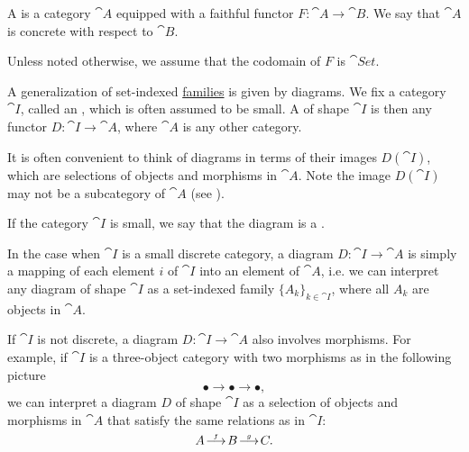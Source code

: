 \begin{definition}\label{def:concrete_category}
  A  is a category \( \cat{A} \) equipped with a faithful functor \( F: \cat{A} \to \cat{B} \). We say that \( \cat{A} \) is concrete with respect to \( \cat{B} \).

  Unless noted otherwise, we assume that the codomain of \( F \) is \( \cat{Set} \).
\end{definition}

\begin{definition}\label{def:categorical_diagram}
  A generalization of set-indexed \hyperref[def:indexed_family]{families} is given by diagrams. We fix a category \( \cat{I} \), called an , which is often assumed to be small. A  of shape \( \cat{I} \) is then any functor \( D: \cat{I} \to \cat{A} \), where \( \cat{A} \) is any other category.

  It is often convenient to think of diagrams in terms of their images \( D(\cat{I}) \), which are selections of objects and morphisms in \( \cat{A} \). Note the image \( D(\cat{I}) \) may not be a subcategory of \( \cat{A} \) (see ).

  If the category \( \cat{I} \) is small, we say that the diagram is a .
\end{definition}

\begin{example}\label{ex:categorical_diagrams}
  \hfill
  \begin{thmenum}
    \item In the case when \( \cat{I} \) is a small discrete category, a diagram \( D: \cat{I} \to \cat{A} \) is simply a mapping of each element \( i \) of \( \cat{I} \) into an element of \( \cat{A} \), i.e. we can interpret any diagram of shape \( \cat{I} \) as a set-indexed family \( \{ A_k \}_{k \in \cat{I}} \), where all \( A_k \) are objects in \( \cat{A} \).

    \item If \( \cat{I} \) is not discrete, a diagram \( D: \cat{I} \to \cat{A} \) also involves morphisms. For example, if \( \cat{I} \) is a three-object category with two morphisms as in the following picture
    \begin{equation*}
      \bullet \longrightarrow \bullet \longrightarrow \bullet,
    \end{equation*}
    we can interpret a diagram \( D \) of shape \( \cat{I} \) as a selection of objects and morphisms in \( \cat{A} \) that satisfy the same relations as in \( \cat{I} \):
    \begin{equation*}
      A
      \reloset f \longrightarrow
      B
      \reloset g \longrightarrow
      C.
    \end{equation*}
  \end{thmenum}
\end{example}


